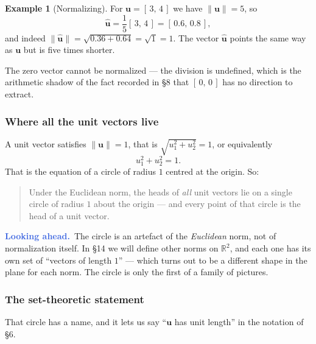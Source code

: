 \documentclass[11pt]{article}
\theoremstyle{definition}
\newtheorem{ex}{Example}[section]
\theoremstyle{remark}
\newcommand{\lookahead}{\par\smallskip\noindent
  \textbf{\sffamily\textcolor{RoyalBlue}{Looking ahead.}}\ \ignorespaces}
\newcommand{\R}{\mathbb{R}}
\newcommand{\vc}[1]{\mathbf{#1}}
\newcommand{\norm}[1]{\lVert #1\rVert}
\newcommand{\uv}[1]{\hat{\vc{#1}}}                 %
\newcommand{\Sph}[1]{\mathbb{S}^{#1}}              %
\newcommand{\lattice}[4]{%
  \draw[step=1cm,gray!25,very thin] (#1,#3) grid (#2,#4);
  \draw[axisline] (#1,0) -- (#2+0.45,0) node[right,font=\scriptsize,black]{$x$};
  \draw[axisline] (0,#3) -- (0,#4+0.45) node[above,font=\scriptsize,black]{$y$};
}
\begin{document}
\begin{ex}[Normalizing]
For $\vc{u}=[\,3,\,4\,]$ we have $\norm{\vc{u}}=5$, so
\[
  \uv{u}=\frac{1}{5}[\,3,\,4\,]=[\,0.6,\,0.8\,],
\]
and indeed $\norm{\uv{u}}=\sqrt{0.36+0.64}=\sqrt{1}=1$. The vector $\uv{u}$
points the same way as $\vc{u}$ but is five times shorter.
\end{ex}

\noindent The zero vector cannot be normalized --- the division is undefined,
which is the arithmetic shadow of the fact recorded in \S8 that
$[\,0,\,0\,]$ has no direction to extract.

\subsubsection*{Where all the unit vectors live}
A unit vector satisfies $\norm{\vc{u}}=1$, that is $\sqrt{u_1^{2}+u_2^{2}}=1$,
or equivalently
\[
  u_1^{2}+u_2^{2}=1 .
\]
That is the equation of a circle of radius $1$ centred at the origin. So:

\begin{quote}
Under the Euclidean norm, the heads of \emph{all} unit vectors lie on a single
circle of radius $1$ about the origin --- and every point of that circle is the
head of a unit vector.
\end{quote}

\begin{center}
\end{center}

\lookahead The circle is an artefact of the \emph{Euclidean} norm, not of
normalization itself. In \S14 we will define other norms on $\R^{2}$, and each
one has its own set of ``vectors of length $1$'' --- which turns out to be a
different shape in the plane for each norm. The circle is only the first of a
family of pictures.

\subsubsection*{The set-theoretic statement}
That circle has a name, and it lets us say ``$\vc{u}$ has unit length'' in the
notation of \S6.
\end{document}
